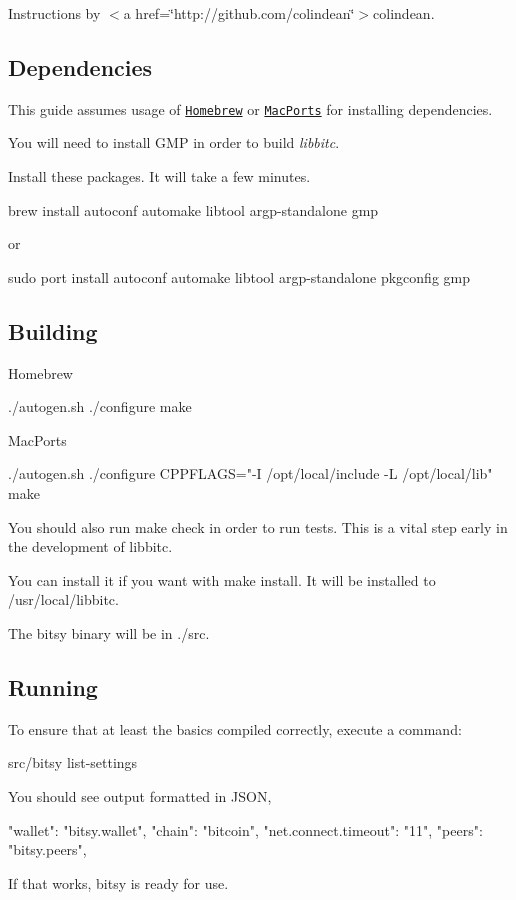 Instructions by $<$a href=\char`\"{}http\-://github.\-com/colindean\char`\"{}$>$colindean.

\subsection*{Dependencies }

This guide assumes usage of \href{http://brew.sh}{\tt Homebrew} or \href{https://www.macports.org}{\tt Mac\-Ports} for installing dependencies.

You will need to install {\ttfamily G\-M\-P} in order to build {\itshape libbitc}.

Install these packages. It will take a few minutes. \begin{DoxyVerb}brew install autoconf automake libtool argp-standalone gmp
\end{DoxyVerb}


or \begin{DoxyVerb}sudo port install autoconf automake libtool argp-standalone pkgconfig gmp
\end{DoxyVerb}


\subsection*{Building }

Homebrew \begin{DoxyVerb}./autogen.sh
./configure
make
\end{DoxyVerb}


Mac\-Ports \begin{DoxyVerb}./autogen.sh
./configure CPPFLAGS="-I /opt/local/include -L /opt/local/lib"
make
\end{DoxyVerb}


You should also run {\ttfamily make check} in order to run tests. This is a vital step early in the development of {\ttfamily libbitc}.

You can install it if you want with {\ttfamily make install}. It will be installed to {\ttfamily /usr/local/libbitc}.

The {\ttfamily bitsy} binary will be in {\ttfamily ./src}.

\subsection*{Running }

To ensure that at least the basics compiled correctly, execute a command\-: \begin{DoxyVerb}src/bitsy list-settings
\end{DoxyVerb}


You should see output formatted in J\-S\-O\-N, \begin{DoxyVerb}{
  "wallet": "bitsy.wallet",
  "chain": "bitcoin",
  "net.connect.timeout": "11",
  "peers": "bitsy.peers",
}
\end{DoxyVerb}


If that works, {\ttfamily bitsy} is ready for use. 
